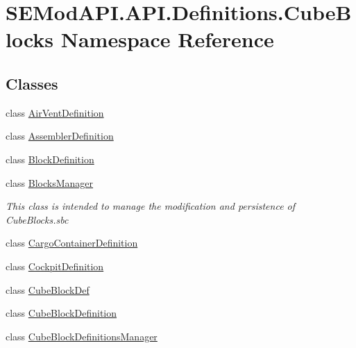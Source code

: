 \hypertarget{namespace_s_e_mod_a_p_i_1_1_a_p_i_1_1_definitions_1_1_cube_blocks}{}\section{S\+E\+Mod\+A\+P\+I.\+A\+P\+I.\+Definitions.\+Cube\+Blocks Namespace Reference}
\label{namespace_s_e_mod_a_p_i_1_1_a_p_i_1_1_definitions_1_1_cube_blocks}
\subsection*{Classes}
\begin{DoxyCompactItemize}
\item 
class \hyperlink{class_s_e_mod_a_p_i_1_1_a_p_i_1_1_definitions_1_1_cube_blocks_1_1_air_vent_definition}{Air\+Vent\+Definition}
\item 
class \hyperlink{class_s_e_mod_a_p_i_1_1_a_p_i_1_1_definitions_1_1_cube_blocks_1_1_assembler_definition}{Assembler\+Definition}
\item 
class \hyperlink{class_s_e_mod_a_p_i_1_1_a_p_i_1_1_definitions_1_1_cube_blocks_1_1_block_definition}{Block\+Definition}
\item 
class \hyperlink{class_s_e_mod_a_p_i_1_1_a_p_i_1_1_definitions_1_1_cube_blocks_1_1_blocks_manager}{Blocks\+Manager}
\begin{DoxyCompactList}\small\item\em This class is intended to manage the modification and persistence of Cube\+Blocks.\+sbc \end{DoxyCompactList}\item 
class \hyperlink{class_s_e_mod_a_p_i_1_1_a_p_i_1_1_definitions_1_1_cube_blocks_1_1_cargo_container_definition}{Cargo\+Container\+Definition}
\item 
class \hyperlink{class_s_e_mod_a_p_i_1_1_a_p_i_1_1_definitions_1_1_cube_blocks_1_1_cockpit_definition}{Cockpit\+Definition}
\item 
class \hyperlink{class_s_e_mod_a_p_i_1_1_a_p_i_1_1_definitions_1_1_cube_blocks_1_1_cube_block_def}{Cube\+Block\+Def}
\item 
class \hyperlink{class_s_e_mod_a_p_i_1_1_a_p_i_1_1_definitions_1_1_cube_blocks_1_1_cube_block_definition}{Cube\+Block\+Definition}
\item 
class \hyperlink{class_s_e_mod_a_p_i_1_1_a_p_i_1_1_definitions_1_1_cube_blocks_1_1_cube_block_definitions_manager}{Cube\+Block\+Definitions\+Manager}

\end{DoxyCompactItemize}
